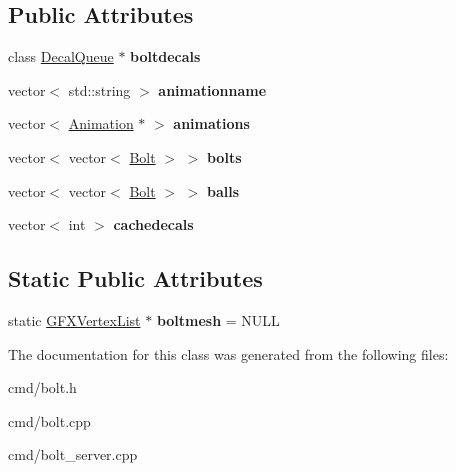\subsection*{Public Attributes}
\begin{DoxyCompactItemize}
\item 
class \hyperlink{classDecalQueue}{Decal\+Queue} $\ast$ {\bfseries boltdecals}\hypertarget{classbolt__draw_ab0137bca9d045d35e87b9747de8c6684}{}\label{classbolt__draw_ab0137bca9d045d35e87b9747de8c6684}

\item 
vector$<$ std\+::string $>$ {\bfseries animationname}\hypertarget{classbolt__draw_ae6695f57a147de98ae8472658a82d21f}{}\label{classbolt__draw_ae6695f57a147de98ae8472658a82d21f}

\item 
vector$<$ \hyperlink{classAnimation}{Animation} $\ast$ $>$ {\bfseries animations}\hypertarget{classbolt__draw_aecba714ff08edde72a8db6153ca61edc}{}\label{classbolt__draw_aecba714ff08edde72a8db6153ca61edc}

\item 
vector$<$ vector$<$ \hyperlink{classBolt}{Bolt} $>$ $>$ {\bfseries bolts}\hypertarget{classbolt__draw_ae5f449ebf7b71bfd3ebe88c8176268be}{}\label{classbolt__draw_ae5f449ebf7b71bfd3ebe88c8176268be}

\item 
vector$<$ vector$<$ \hyperlink{classBolt}{Bolt} $>$ $>$ {\bfseries balls}\hypertarget{classbolt__draw_a27b2acdd888236a7bdc22bd2ea785a74}{}\label{classbolt__draw_a27b2acdd888236a7bdc22bd2ea785a74}

\item 
vector$<$ int $>$ {\bfseries cachedecals}\hypertarget{classbolt__draw_add4dcc9d6252b8a1eb7a6852c5a6d26f}{}\label{classbolt__draw_add4dcc9d6252b8a1eb7a6852c5a6d26f}

\end{DoxyCompactItemize}
\subsection*{Static Public Attributes}
\begin{DoxyCompactItemize}
\item 
static \hyperlink{classGFXVertexList}{G\+F\+X\+Vertex\+List} $\ast$ {\bfseries boltmesh} = N\+U\+LL\hypertarget{classbolt__draw_ad29a59932eda1f22ee1c5dcc1d3a8f09}{}\label{classbolt__draw_ad29a59932eda1f22ee1c5dcc1d3a8f09}

\end{DoxyCompactItemize}


The documentation for this class was generated from the following files\+:\begin{DoxyCompactItemize}
\item 
cmd/bolt.\+h\item 
cmd/bolt.\+cpp\item 
cmd/bolt\+\_\+server.\+cpp\end{DoxyCompactItemize}
